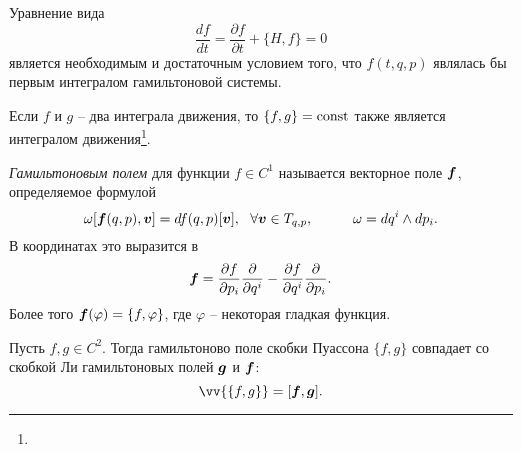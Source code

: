 \begin{to_lem} 
    Уравнение вида 
    \begin{equation*}
         \frac{d f}{d t} = \frac{\partial f}{\partial t} + \{H, f\} = 0
     \end{equation*} 
     является необходимым и достаточным условием того, что $f(t, q, p)$ являлась бы первым интегралом гамильтоновой системы.
\end{to_lem}

\begin{to_thr}
     Если $f$ и $g$ -- два интеграла движения, то $\{f, g\} = \text{const}$ также является интегралом движения\footnote{
     }.
\end{to_thr}

\begin{to_def} 
    \textit{Гамильтоновым полем} для функции $f \in C^1$ называется векторное поле $\mbox{\boldmath $f$}$, определяемое формулой
    \begin{equation*}
        \omega[ \mbox{\boldmath $f$}(q, p), \mbox{\boldmath $v$}] = df(q, p) [\mbox{\boldmath $v$}], \ \ \forall \mbox{\boldmath $v$} \in T_{q, p},
        \hspace{1cm} 
        \omega = dq^i \wedge dp_i.
    \end{equation*}
    В координатах это выразится в 
    \begin{equation*}
        \mbox{\boldmath $f$} = \frac{\partial f}{\partial p_i} \frac{\partial }{\partial q^i} - \frac{\partial f}{\partial q^i} \frac{\partial }{\partial p_i}.
    \end{equation*}
    Более того $\mbox{\boldmath $f$}(\varphi) = \{f, \varphi\}$, где $\varphi$ -- некоторая гладкая функция.
\end{to_def}

\begin{to_thr}
     Пусть $f, g \in C^2$. Тогда гамильтоново поле скобки Пуассона $\{f, g\}$ совпадает со скобкой Ли гамильтоновых полей $\mbox{\boldmath $g$}$ и $\mbox{\boldmath $f$}$: 
     \begin{equation*}
         \vv{
         \{f, g\}
         } = [\vc{f}, \vc{g}].
     \end{equation*}
\end{to_thr}

